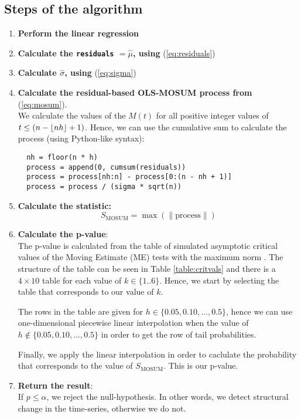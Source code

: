 \documentclass[main.tex]{subfiles}
\begin{document}
\subsection{Steps of the algorithm}
\label{subsec:the_algorithm_steps}
\begin{enumerate}
\item \textbf{Perform the linear regression}
\item \textbf{Calculate the \texttt{residuals} $=\hat{\mu}$, using} (\ref{eq:residuals})
\item \textbf{Calculate $\hat{\sigma}$, using} (\ref{eq:sigma})
\item \textbf{Calculate the residual-based OLS-MOSUM process from} (\ref{eq:mosum}). \\
  We calculate the values of the $M(t)$ for all positive integer values of
  $t \leq (n - \lfloor nh\rfloor + 1)$. Hence, we can use the cumulative sum to calculate the process
  (using Python-like syntax):
  \begin{verbatim}
  nh = floor(n * h)
  process = append(0, cumsum(residuals))
  process = process[nh:n] - process[0:(n - nh + 1)]
  process = process / (sigma * sqrt(n))
  \end{verbatim}
\item \textbf{Calculate the statistic:}
  \[
  S_{\text{MOSUM}} = \max(\|\text{process}\|)
  \]
\item \textbf{Calculate the p-value}:\\
  The p-value is calculated from the table of
  simulated asymptotic critical values of the Moving Estimate (ME) tests with
  the maximum norm \cite{moving_estimate_test}. The structure of the table can
  be seen in Table \ref{table:critvals} and there is a $4 \times 10$ table for
  each value of $k \in \{1..6\}$. Hence, we start by selecting the table that
  corresponds to our value of $k$.

  The rows in the table are
  given for $h \in \{0.05, 0.10, ..., 0.5\}$, hence we can use one-dimensional
  piecewise linear interpolation when the value of
  $h \notin \{0.05, 0.10, ..., 0.5\}$ in order to get the row of tail
  probabilities.

  Finally, we apply the linear interpolation in order to caclulate the
  probability that corresponds to the value of $S_{\text{MOSUM}}$. This is our p-value.
\item \textbf{Return the result}: \\
  If $p \leq \alpha$, we reject the null-hypothesis. In other words, we detect
  structural change in the time-series, otherwise we do not.
\end{enumerate}
\end{document}
